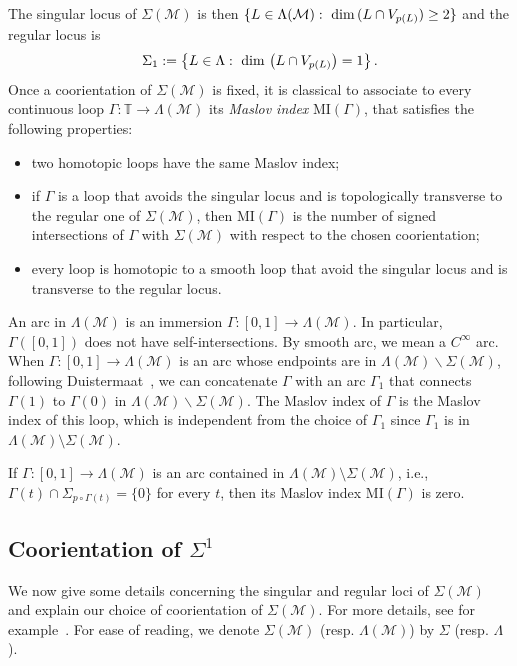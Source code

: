 \documentclass[AHL, Unicode, longabstracts, published]{cedram}
\newcommand*\M{\mathcal{M}}
\newcommand*\cm{\mathcal{M}}
\newcommand*\cal{\mathcal}
\newcommand{\MI}{\mathrm{MI}}
\newcommand*\T{\mathbb{T}}
\renewcommand*\dim{{\rm dim}\,}
\begin{document}
The singular locus of $\Sigma(\cal M)$ is then $\{ L\in\Lambda(\cal M) :\ \dim(L\cap V_{p(L)})\geq 2 \}$ and the regular locus is
\begin{equation}\label{Esinglocus}
\Sigma_1:=\left\{ L\in\Lambda :\ \dim\left(L\cap V_{p(L)}\right)=1 \right\}.
\end{equation}
Once a coorientation of $\Sigma(\cal M)$ is fixed, it is classical to associate to every continuous loop $\Gamma:\T\rightarrow \Lambda (\cal M)$ its \emph{Maslov index} $\MI(\Gamma)$, that satisfies the following properties:
\begin{itemize}
\item two homotopic loops have the same Maslov index;
\item if $\Gamma$ is a loop that avoids the singular locus and is topologically transverse to the regular one of $\Sigma(\cal M)$, then $\MI(\Gamma)$ is the number of signed intersections of $\Gamma$ with $\Sigma(\cal M)$ with respect to the chosen coorientation;
\item every loop is homotopic to a smooth loop that avoid the singular locus and is transverse to the regular locus.
\end{itemize}
An arc in $\Lambda(\cal M)$ is an immersion $\Gamma:[0,1]\to\Lambda(\cal M)$. In particular, $\Gamma([0,1])$ does not have self-intersections. By smooth arc, we mean a $C^\infty$ arc. When $\Gamma: [0, 1]\rightarrow \Lambda(\cal M)$ is an arc whose endpoints are in $\Lambda(\M)\backslash \Sigma(\M)$, following Duistermaat~\cite[p.~183]{Dui76}, we can concatenate $\Gamma$ with an arc $\Gamma_1$ that connects $\Gamma (1)$ to $\Gamma(0)$ in $\Lambda(\M)\backslash \Sigma(\M)$. The Maslov index of $\Gamma$ is the Maslov index of this loop, which is independent from the choice of $\Gamma_1$ { since $\Gamma_1$ is in $\Lambda(\M)\setminus\Sigma(\M)$}.


\begin{rema}\label{rmq path transverse}
If $\Gamma:[0,1]\to\Lambda(\cm)$ is an arc contained in $\Lambda(\cm)\setminus\Sigma(\cm)$, i.e., $\Gamma(t)\cap\Sigma_{p\circ\Gamma(t)}=\{0\}$ for every $t$, then its Maslov index $\MI(\Gamma)$ is zero.
\end{rema}

\subsection{Coorientation of \texorpdfstring{$\Sigma^1$}{Sigma1}}\label{subsec defi MI}


We now give some details concerning the singular and regular loci of $\Sigma (\cal M)$ and explain our choice of coorientation of $\Sigma(\cal M)$. For more details, see for example~\cite{Dui76}. For ease of reading, we denote $\Sigma (\cal M)$ (resp. $\Lambda(\cal M)$) by $\Sigma$ (resp. $\Lambda$).
\end{document}
